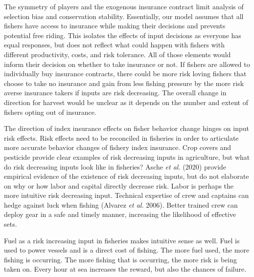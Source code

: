 \documentclass[
  letterpaper,
  DIV=11,
  numbers=noendperiod]{scrartcl}
\theoremstyle{plain}
\theoremstyle{plain}
\theoremstyle{remark}
\begin{document}
The symmetry of players and the exogenous insurance contract limit
analysis of selection bias and conservation stability. Essentially, our
model assumes that all fishers have access to insurance while making
their decisions and prevents potential free riding. This isolates the
effects of input decisions as everyone has equal responses, but does not
reflect what could happen with fishers with different productivity,
costs, and risk tolerance. All of those elements would inform their
decision on whether to take insurance or not. If fishers are allowed to
individually buy insurance contracts, there could be more risk loving
fishers that choose to take no insurance and gain from less fishing
pressure by the more risk averse insurance takers if inputs are risk
decreasing. The overall change in direction for harvest would be unclear
as it depends on the number and extent of fishers opting out of
insurance.

The direction of index insurance effects on fisher behavior change
hinges on input risk effects. Risk effects need to be reconciled in
fisheries in order to articulate more accurate behavior changes of
fishery index insurance. Crop covers and pesticide provide clear
examples of risk decreasing inputs in agriculture, but what do risk
decreasing inputs look like in fisheries? Asche \emph{et al.} (2020)
provide empirical evidence of the existence of risk decreasing inputs,
but do not elaborate on why or how labor and capital directly decrease
risk. Labor is perhaps the more intuitive risk decreasing input.
Technical expertise of crew and captains can hedge against luck when
fishing (Alvarez \emph{et al.} 2006). Better trained crew can deploy
gear in a safe and timely manner, increasing the likelihood of effective
sets.

Fuel as a risk increasing input in fisheries makes intuitive sense as
well. Fuel is used to power vessels and is a direct cost of fishing. The
more fuel used, the more fishing is occurring. The more fishing that is
occurring, the more risk is being taken on. Every hour at sea increases
the reward, but also the chances of failure.
\end{document}
